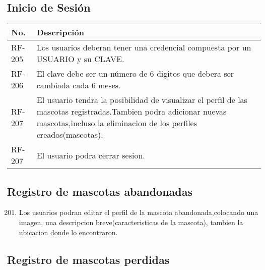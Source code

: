 \subsection{Inicio de Sesión}
	\begin{table}[h!]	
		\begin{tabular}{ |p{2cm}|p{12cm}| }	\hline
			
			\rowcolor{gray!50}  \textbf{No.}  &  \textbf{Descripción} \\ \hline
			
			RF-205&Los usuarios deberan tener una credencial compuesta por un USUARIO y su CLAVE.  \\	\hline
			
			RF-206&El clave debe ser un número de 6 digitos que debera ser cambiada cada 6 meses.  \\ \hline
			
			RF-207&El usuario tendra la posibilidad de visualizar el perfil de las mascotas registradas.Tambien podra adicionar nuevas mascotas,incluso la eliminacion de los perfiles creados(mascotas).  \\ \hline
		
			
			RF-207&El usuario podra cerrar sesion.  \\ \hline
				
		
		\end{tabular}
	\end{table}	


\subsection{Registro de mascotas abandonadas}

\begin{flushright}

	\begin{enumerate} [label=RF-\arabic*. , align=left]
		\setcounter{enumi}{200}	 %
		\item Los usuarios podran editar el perfil de la mascota abandonada,colocando una imagen, una descripcion breve(caracteristicas de la mascota), tambien la ubicacion donde lo encontraron.
		 
		
	\end{enumerate}

\end{flushright}
\subsection{Registro de mascotas perdidas}

